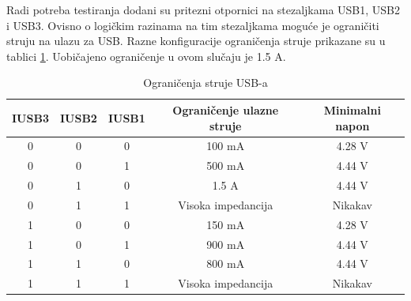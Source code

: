 Radi potreba testiranja dodani su pritezni otpornici na stezaljkama USB1, USB2 i USB3. Ovisno o logičkim razinama na tim stezaljkama moguće je ograničiti struju na ulazu za USB. Razne konfiguracije ograničenja struje prikazane su u tablici \ref{tab:USB_ILIM}. Uobičajeno ograničenje u ovom slučaju je 1.5 A.
\begin{table}[htbp]
    \centering
    \caption{Ograničenja struje USB-a \cite{ti:bq24166}}
    \begin{tabular}{|c|c|c|c|c|} \hline
    IUSB3 & IUSB2 & IUSB1 & Ograničenje ulazne struje & Minimalni napon \\
    \hline
    0 & 0 & 0 & 100 mA & 4.28 V \\
    \hline
    0 & 0 & 1 & 500 mA & 4.44 V \\
    \hline
    0 & 1 & 0 & 1.5 A & 4.44 V \\
    \hline
    0 & 1 & 1 & Visoka impedancija & Nikakav \\
    \hline
    1 & 0 & 0 & 150 mA & 4.28 V \\
    \hline
    1 & 0 & 1 & 900 mA & 4.44 V \\
    \hline
    1 & 1 & 0 & 800 mA & 4.44 V \\
    \hline
    1 & 1 & 1 & Visoka impedancija & Nikakav \\
    \hline
    \end{tabular}%
    \label{tab:USB_ILIM}%
\end{table}%

